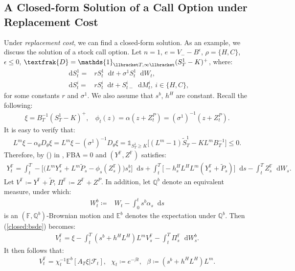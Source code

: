 \documentclass[a4paper, 11pt]{article}              %
\numberwithin{equation}{section}
\theoremstyle{plain}
\newcommand{\1}{\mathds{1}}
\newcommand{\calF}{\mathcal{F}}
\newcommand{\frD}{\textfrak{D}}
\newcommand{\St}{\tilde{S}}
\newcommand{\pt}{\tilde{P}}
\newcommand{\dsE}{\mathbb{E}}
\newcommand{\dsF}{\mathbb{F}}
\newcommand{\dsQ}{\mathbb{Q}}
\theoremstyle{plain}
\theoremstyle{definition}
\theoremstyle{plain}
\newcommand*\df{\mathop{}\!\mathrm{d}}
\newcommand{\rom}[1]{\lowercase\expandafter{\romannumeral #1\relax}}
\begin{document}
\subsection{A Closed-form Solution of a Call Option under Replacement Cost}
Under \textit{replacement cost}, we can find a closed-form solution.
As an example, we discuss  the solution of a stock call option. 
Let $n=1$, $e=V_- -B^\epsilon$, $\rho = \{H, C\}$,
$\epsilon\leq0$, $\frD = \1_{\llbracket T, \infty\llbracket}(S^1_T - K)^+$, where:
\begin{align}
 \df S^1_t =& r S^1_t \df t + \sigma^1 S^1_t \df W_t, \nonumber \\  
 \df S^i_t =& r S^i_t \df t +  S^i_{t-} \df M^i_t, ~i\in \{H, C\},    \nonumber 
\end{align}
for some constants $r$ and $\sigma^1$. We also assume that $s^b$, $h^H$ are
constant. Recall the following: 
\begin{align}
  \xi = B_T^{-1}(S^1_T - K)^+, ~~~~ \phi_t(z) = \alpha(z+Z^P_t) =(\sigma^1)^{-1}(z+Z^P_t).\nonumber 
\end{align}
It is easy to verify that:
\begin{align}
  L^m \xi -\alpha_\theta D_\theta\xi
  =   L^m \xi -(\sigma^1)^{-1}D_\theta\xi =\1_{S^1_T \geq K}\big[(L^m-1)\St^1_T - KL^mB_T^{-1}
     \big]\leq0. \nonumber 
\end{align}
Therefore, by (\rom{1}) in , FBA$=0$ and $(Y^\dsF,
Z^\dsF)$ satisfies:
\begin{align}
  Y^\dsF_t = \int_{t}^{T} -\bigg[\Big(L^mY^\dsF_s +L^m\pt_s-\phi_s(Z^\dsF_s)\Big)s^{b}_s\bigg]\df s 
  +\int_{t}^{T}
    \big[-h^H_sL^HL^m(Y^\dsF_s+\pt_s)\big]\df s
    -\int_{t}^{T}Z^\dsF_s\df W_s. \label{closed:bsde}
\end{align}
Let $V^\dsF \coloneqq Y^\dsF + \pt$, $\Pi^\dsF \coloneqq Z^\dsF + Z^P$. In addition, let
$\dsQ^b$ denote an equivalent measure, under which:
\begin{align}
    W^b_t \coloneqq &W_t -\int_{0}^{t}s^b\alpha_s  \df s \label{bB}
\end{align}
is an $(\dsF, \dsQ^b)$-Brownian motion and $\dsE^b$ denotes the expectation under
$\dsQ^b$. Then (\ref{closed:bsde}) becomes:
\begin{align}
 V^\dsF_t = \xi -\int_{t}^{T} (s^b + h^HL^H)L^m V^\dsF_s - \int_{t}^{T}\Pi^\dsF_s \df
  W^b_s.  \nonumber 
\end{align}
It then follows that:
\begin{align}
  V^\dsF_t = \chi^{-1}_t\dsE^b[A_T\xi |\calF_t], ~~~\chi_t \coloneqq e^{-\beta t},
              ~~~\beta\coloneqq (s^b + h^HL^H)L^m. \label{firstrep}
\end{align}
\end{document}
